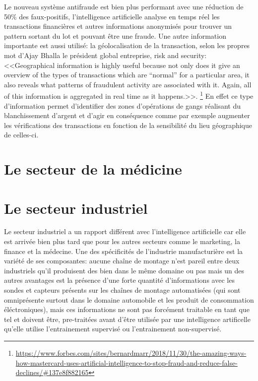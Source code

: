 Le nouveau système antifraude est bien plus performant avec une réduction 
de 50\% des faux-positifs, l'intelligence artificielle analyse en temps réel 
les transactions financières et autres informations anonymisés
pour trouver un pattern sortant du lot et pouvant être une fraude. 
Une autre information importante est aussi utilisé: la géolocalisation 
de la transaction, selon les propres mot d'Ajay Bhalla le président 
global entreprise, risk and security: <<Geographical information is highly useful because 
not only does it give an overview of the types of transactions which are “normal” 
for a particular area, it also reveals what patterns of fraudulent activity 
are associated with it. Again, all of this information is aggregated in real time 
as it happens.>>.
\footnote{\url{https://www.forbes.com/sites/bernardmarr/2018/11/30/the-amazing-ways-how-mastercard-uses-artificial-intelligence-to-stop-fraud-and-reduce-false-declines/\#137e8f882165}}
En effet ce type d'information permet d'identifier des zones d'opérations de gangs réalisant du blanchissement 
d'argent et d'agir en conséquence comme par exemple augmenter les vérifications des transactions en fonction
de la sensibilité du lieu géographique de celles-ci.

\section{Le secteur de la médicine}

\section{Le secteur industriel}
Le secteur industriel a un rapport différent avec l'intelligence artificielle car elle est arrivée 
bien plus tard que pour les autres secteurs comme le marketing, la finance et la médecine.
Une des spécificités de l'industrie manufacturière est la variété de ses composantes: 
aucune chaîne de montage n'est pareil entre deux industriels qu'il produisent des bien 
dans le même domaine ou pas mais un des autres avantages est la présence d'une forte quantité 
d'informations avec les sondes et capteurs présents sur les chaînes de montage automatisées 
(qui sont omniprésente surtout dans le domaine 
automobile et les produit de consommation éléctroniques), 
mais ces informations ne sont pas forcément traitable en tant que tel et doivent être, pre-traitées
avant d'être utilisée par une intelligence artificelle qu'elle utilise l'entrainement 
supervisé ou l'entrainement non-supervisé. \newline

